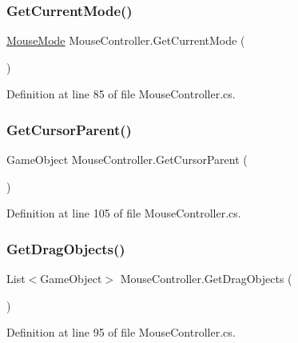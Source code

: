 \subsubsection{\texorpdfstring{Get\+Current\+Mode()}{GetCurrentMode()}}
{\footnotesize\ttfamily \hyperlink{class_mouse_controller_aa9b016ba73cc945841e3fae192330a51}{Mouse\+Mode} Mouse\+Controller.\+Get\+Current\+Mode (\begin{DoxyParamCaption}{ }\end{DoxyParamCaption})}



Definition at line 85 of file Mouse\+Controller.\+cs.

\mbox{\label{class_mouse_controller_aa4c2fcaf3a053b691fec75a34d93b5c4}} 
\subsubsection{\texorpdfstring{Get\+Cursor\+Parent()}{GetCursorParent()}}
{\footnotesize\ttfamily Game\+Object Mouse\+Controller.\+Get\+Cursor\+Parent (\begin{DoxyParamCaption}{ }\end{DoxyParamCaption})}



Definition at line 105 of file Mouse\+Controller.\+cs.

\mbox{\label{class_mouse_controller_a8afd7ab9fc2d9768228c59250f27c3f8}} 
\subsubsection{\texorpdfstring{Get\+Drag\+Objects()}{GetDragObjects()}}
{\footnotesize\ttfamily List$<$Game\+Object$>$ Mouse\+Controller.\+Get\+Drag\+Objects (\begin{DoxyParamCaption}{ }\end{DoxyParamCaption})}



Definition at line 95 of file Mouse\+Controller.\+cs.

\mbox{\label{class_mouse_controller_a1cc8e4525f57977037f3cae9e70327ab}} 
